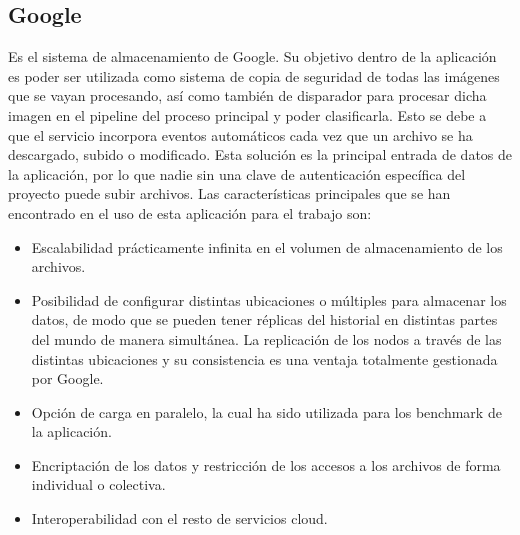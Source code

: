 \subsection{Google }\label{subsec:storage}
Es el sistema de almacenamiento de Google.
Su objetivo dentro de la aplicación es poder ser utilizada como sistema de copia de seguridad de todas las imágenes que se vayan procesando, así como también de disparador para procesar dicha imagen en el pipeline del proceso principal y poder clasificarla.
Esto se debe a que el servicio incorpora eventos automáticos cada vez que un archivo se ha descargado, subido o modificado.
Esta solución es la principal entrada de datos de la aplicación, por lo que nadie sin una clave de autenticación específica del proyecto puede subir archivos.
Las características principales que se han encontrado en el uso de esta aplicación para el trabajo son:
\begin{itemize}
    \item Escalabilidad prácticamente infinita en el volumen de almacenamiento de los archivos.
    \item Posibilidad de configurar distintas ubicaciones o múltiples para almacenar los datos, de modo que se pueden tener réplicas del historial en distintas partes del mundo de manera simultánea.
    La replicación de los nodos a través de las distintas ubicaciones y su consistencia es una ventaja totalmente gestionada por Google.
    \item Opción de carga en paralelo, la cual ha sido utilizada para los benchmark de la aplicación.
    \item Encriptación de los datos y restricción de los accesos a los archivos de forma individual o colectiva.
    \item Interoperabilidad con el resto de servicios cloud.
\end{itemize}

